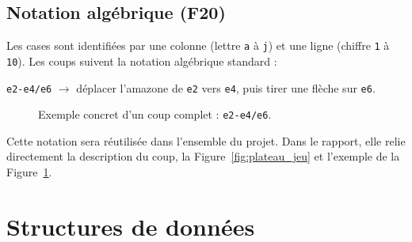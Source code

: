 \documentclass[a4paper]{article}
\begin{document}
\subsection{Notation algébrique (F20)}

Les cases sont identifiées par une colonne (lettre \texttt{a} à \texttt{j}) et une ligne (chiffre \texttt{1} à \texttt{10}). Les coups suivent la notation algébrique standard :

\begin{center}
    \texttt{e2-e4/e6} $\rightarrow$ déplacer l'amazone de \texttt{e2} vers \texttt{e4}, puis tirer une flèche sur \texttt{e6}.
\end{center}

\begin{figure}[H]
\centering
{}
\caption{Exemple concret d'un coup complet : \texttt{e2-e4/e6}.}
\label{fig:move-example}
\end{figure}

Cette notation sera réutilisée dans l'ensemble du projet. Dans le rapport, elle relie directement la description du coup, la Figure~\ref{fig:plateau_jeu} et l'exemple de la Figure~\ref{fig:move-example}.


\section{Structures de données}
\end{document}
